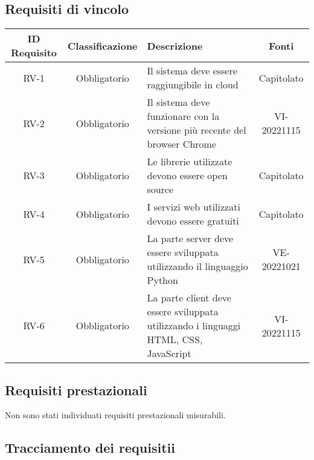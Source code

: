 \subsection{Requisiti di vincolo}
\renewcommand\tabularxcolumn[1]{>{\Centering}m{#1}}
\begin{tabularx}{\textwidth}{| c | c | X | c |} 
 \hline
 \textbf{ID Requisito} & \textbf{Classificazione} & \textbf{Descrizione} & \textbf{Fonti} \\
 \hline
 RV-1 & Obbligatorio &  Il sistema deve essere raggiungibile in cloud & Capitolato\\
 \hline
  RV-2 & Obbligatorio & Il sistema deve funzionare con la versione più recente del browser Chrome & VI-20221115\\
 \hline
 RV-3 & Obbligatorio &  Le librerie utilizzate devono essere open source & Capitolato\\
 \hline
 RV-4 & Obbligatorio & I servizi web utilizzati devono essere gratuiti &  Capitolato\\
 \hline
 RV-5 & Obbligatorio & La parte server deve essere sviluppata utilizzando il linguaggio Python & VE-20221021\\
 \hline
 RV-6 & Obbligatorio & La parte client deve essere sviluppata utilizzando i linguaggi HTML, CSS, JavaScript & VI-20221115\\
 \hline
\end{tabularx}

\subsection{Requisiti prestazionali}
Non sono stati individuati requisiti prestazionali misurabili.


\subsection{Tracciamento dei requisitii}

